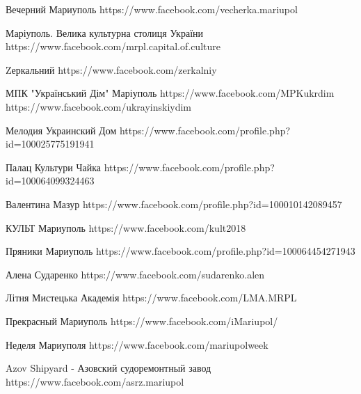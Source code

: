 
 
 
 
 

Вечерний Мариуполь
https://www.facebook.com/vecherka.mariupol

Маріуполь. Велика культурна столиця України
https://www.facebook.com/mrpl.capital.of.culture

Zеркальний
https://www.facebook.com/zerkalniy

МПК "Український Дім" Маріуполь
https://www.facebook.com/MPKukrdim
https://www.facebook.com/ukrayinskiydim

Мелодия Украинский Дом
https://www.facebook.com/profile.php?id=100025775191941

Палац Культури Чайка
https://www.facebook.com/profile.php?id=100064099324463

Валентина Мазур
https://www.facebook.com/profile.php?id=100010142089457

КУЛЬТ Мариуполь
https://www.facebook.com/kult2018

Пряники Мариуполь
https://www.facebook.com/profile.php?id=100064454271943

Алена Сударенко
https://www.facebook.com/sudarenko.alen

Літня Мистецька Академія
https://www.facebook.com/LMA.MRPL

Прекрасный Мариуполь
https://www.facebook.com/iMariupol/

Неделя Мариуполя
https://www.facebook.com/mariupolweek

Azov Shipyard - Азовский судоремонтный завод
https://www.facebook.com/asrz.mariupol







